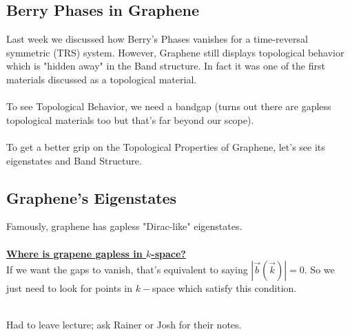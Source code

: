 \documentclass[11pt]{article}
\begin{document}
\subsection{Berry Phases in Graphene}
Last week we discussed how Berry's Phases vanishes for a time-reversal symmetric (TRS) system. However, Graphene still displays topological behavior which is "hidden away" in the Band structure. In fact it was one of the first materials discussed as a topological material.
\\
\\
To see Topological Behavior, we need a bandgap (turns out there are gapless topological materials too but that's far beyond our scope).
\\
\\
To get a better grip on the Topological Properties of Graphene, let's see its eigenstates and Band Structure.

\vskip 1cm
\subsection{Graphene's Eigenstates}
Famously, graphene has gapless "Dirac-like" eigenstates. \\
\\
\textbf{\underline{Where is grapene gapless in $k$-space?
}}\\
If we want the gaps to vanish, that's equivalent to saying $|\vec{b}(\vec{k})| = 0$. So we just need to look for points in $k-$space which satisfy this condition.
\\
\\
\begin{note}
  {Had to leave lecture; ask Rainer or Josh for their notes.}
\end{note}
\end{document}
